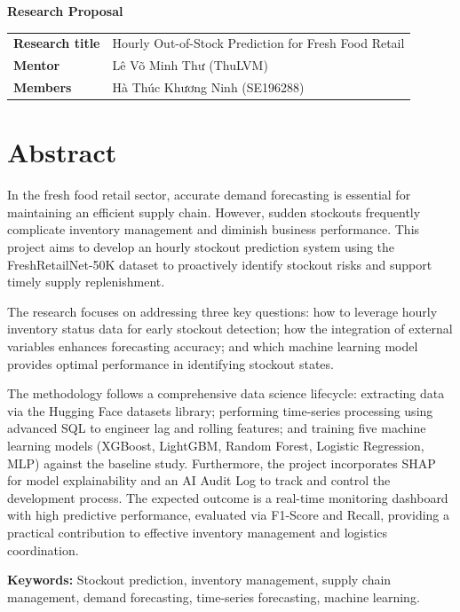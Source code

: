 \documentclass[11pt]{article}
\begin{document}
\sloppy

\begin{center}
{\LARGE\bfseries Research Proposal}
\end{center}

\begin{table}[htbp]
\centering
\begin{tabularx}{\textwidth}{>{\bfseries}p{}X}
\toprule
Research title & Hourly Out-of-Stock Prediction for Fresh Food Retail \\
Mentor & Lê Võ Minh Thư (ThuLVM) \\
Members & Hà Thúc Khương Ninh (SE196288) \\
\bottomrule
\end{tabularx}
\end{table}

\section*{Abstract}

In the fresh food retail sector, accurate demand forecasting is essential for maintaining an efficient supply chain. However, sudden stockouts frequently complicate inventory management and diminish business performance. This project aims to develop an hourly stockout prediction system using the FreshRetailNet-50K dataset to proactively identify stockout risks and support timely supply replenishment.

The research focuses on addressing three key questions: how to leverage hourly inventory status data for early stockout detection; how the integration of external variables enhances forecasting accuracy; and which machine learning model provides optimal performance in identifying stockout states.

The methodology follows a comprehensive data science lifecycle: extracting data via the Hugging Face datasets library; performing time-series processing using advanced SQL to engineer lag and rolling features; and training five machine learning models (XGBoost, LightGBM, Random Forest, Logistic Regression, MLP) against the baseline study. Furthermore, the project incorporates SHAP for model explainability and an AI Audit Log to track and control the development process. The expected outcome is a real-time monitoring dashboard with high predictive performance, evaluated via F1-Score and Recall, providing a practical contribution to effective inventory management and logistics coordination.

\textbf{Keywords:} Stockout prediction, inventory management, supply chain management, demand forecasting, time-series forecasting, machine learning.
\end{document}
